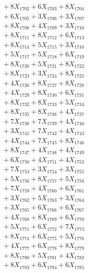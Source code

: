 \documentclass[a4paper,10pt]{article}
\begin{document}
{\begin{align}
&\;  + 8 X_{1702} + 6 X_{1703} + 8 X_{1704} \\[0.3ex]
&\;  + 6 X_{1705} + 3 X_{1706} + 3 X_{1707} \\[0.3ex]
&\;  + 8 X_{1708} + 4 X_{1709} + 3 X_{1710} \\[0.3ex]
&\;  + 8 X_{1711} + 8 X_{1712} + 6 X_{1713} \\[0.3ex]
&\;  + 8 X_{1714} + 5 X_{1715} + 3 X_{1716} \\[0.3ex]
&\;  + 5 X_{1717} + 5 X_{1718} + 6 X_{1719} \\[0.5ex]\allowbreak
&\;  + 8 X_{1720} + 5 X_{1721} + 8 X_{1722} \\[0.3ex]
&\;  + 8 X_{1723} + 3 X_{1724} + 8 X_{1725} \\[0.3ex]
&\;  + 4 X_{1726} + 8 X_{1727} + 8 X_{1728} \\[0.3ex]
&\;  + 4 X_{1729} + 8 X_{1730} + 6 X_{1731} \\[0.3ex]
&\;  + 8 X_{1732} + 8 X_{1733} + 5 X_{1734} \\[0.3ex]
&\;  + 8 X_{1735} + 8 X_{1736} + 4 X_{1737} \\[0.3ex]
&\;  + 7 X_{1738} + 7 X_{1739} + 4 X_{1740} \\[0.3ex]
&\;  + 3 X_{1741} + 7 X_{1742} + 4 X_{1743} \\[0.3ex]
&\;  + 4 X_{1744} + 7 X_{1745} + 8 X_{1746} \\[0.3ex]
&\;  + 8 X_{1747} + 4 X_{1748} + 4 X_{1749} \\[0.5ex]\allowbreak
&\;  + 6 X_{1750} + 4 X_{1751} + 4 X_{1752} \\[0.3ex]
&\;  + 7 X_{1753} + 3 X_{1754} + 3 X_{1755} \\[0.3ex]
&\;  + 5 X_{1756} + 8 X_{1757} + 5 X_{1758} \\[0.3ex]
&\;  + 7 X_{1759} + 4 X_{1760} + 6 X_{1761} \\[0.3ex]
&\;  + 3 X_{1762} + 5 X_{1763} + 3 X_{1764} \\[0.3ex]
&\;  + 3 X_{1765} + 6 X_{1766} + 6 X_{1767} \\[0.3ex]
&\;  + 4 X_{1768} + 8 X_{1769} + 6 X_{1770} \\[0.3ex]
&\;  + 5 X_{1771} + 6 X_{1772} + 7 X_{1773} \\[0.3ex]
&\;  + 8 X_{1774} + 6 X_{1775} + 5 X_{1776} \\[0.3ex]
&\;  + 4 X_{1777} + 6 X_{1778} + 8 X_{1779} \\[0.5ex]\allowbreak
&\;  + 8 X_{1780} + 5 X_{1781} + 4 X_{1782} \\[0.3ex]
&\;  + 8 X_{1783} + 6 X_{1784} + 6 X_{1785} \\[0.3ex]

\end{align}}
\end{document}
